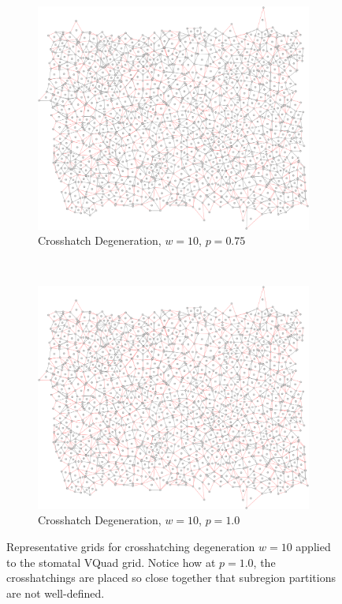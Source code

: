 \documentclass[a4paper,11pt,twoside]{report}
\begin{document}
\begin{figure}[htp]
\begin{subfigure}[t]{0.4\textwidth}
  \end{subfigure}

\begin{subfigure}[t]{0.4\textwidth}
  \centering
  \includegraphics[width=\textwidth]{ch6_figs/cross_hatch_p75_w10}
  \caption{Crosshatch Degeneration, $w=10$, $p=0.75$}

  \end{subfigure}
~
\begin{subfigure}[t]{0.4\textwidth}
  \centering
  \includegraphics[width=\textwidth]{ch6_figs/cross_hatch_p100_w10}
  \caption{Crosshatch Degeneration, $w=10$, $p=1.0$}

  \end{subfigure}

\caption[Crosshatch Degeneration, $w=10$]{
  Representative grids for crosshatching degeneration $w=10$ applied to the stomatal VQuad grid. Notice how at $p=1.0$, the crosshatchings are placed so close together that subregion partitions are not well-defined.
}
\label{fig:ch_w10_grid}
\end{figure}
\end{document}
